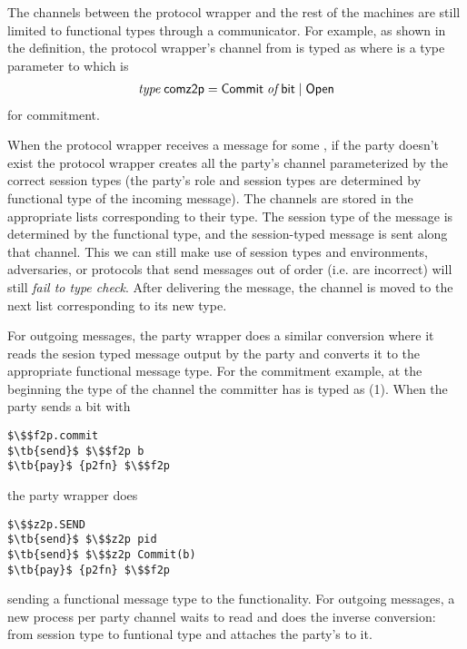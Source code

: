 The channels between the protocol wrapper and the rest of the machines are still limited to functional types through a communicator. 
For example, as shown in the  definition, the protocol wrapper's channel from \Environment is typed as  where  is a type parameter to  which is
\begin{gather}
\mbox{\it type} \; \mathsf{comz2p} = \mathsf{Commit} \; \mbox{\it of} \; \mathsf{bit} \; | \; \mathsf{Open}
\end{gather}
for commitment.

When the protocol wrapper receives a message for some , if the party doesn't exist the protocol wrapper creates all the party's channel parameterized by the correct session types (the party's role and session types are determined by functional type of the incoming message).
The channels are stored in the appropriate lists corresponding to their type.
The session type of the message is determined by the functional type, and the session-typed message is sent along that channel.
This we can still make use of session types and environments, adversaries, or protocols that send messages out of order (i.e. are incorrect) will still \textit{fail to type check}.
After delivering the message, the channel is moved to the next list corresponding to its new type.

For outgoing messages, the party wrapper does a similar conversion where it reads the sesion typed message output by the party and converts it to the appropriate functional message type.
For the commitment example, at the beginning the type of the  channel the committer has is typed as (1). 
When the party  sends a bit with
\begin{lstlisting}[basicstyle=\small\BeraMonottFamily, frame=single, mathescape]
$\$$f2p.commit 
$\tb{send}$ $\$$f2p b
$\tb{pay}$ {p2fn} $\$$f2p 
\end{lstlisting}
the party wrapper does
\begin{lstlisting}[basicstyle=\small\BeraMonottFamily, frame=single, mathescape]
$\$$z2p.SEND 
$\tb{send}$ $\$$z2p pid 
$\tb{send}$ $\$$z2p Commit(b)
$\tb{pay}$ {p2fn} $\$$f2p
\end{lstlisting}
sending a functional message type to the functionality.
For outgoing messages, a new process per party channel waits to read and does the inverse conversion: from session type to funtional type and attaches the party's  to it.

